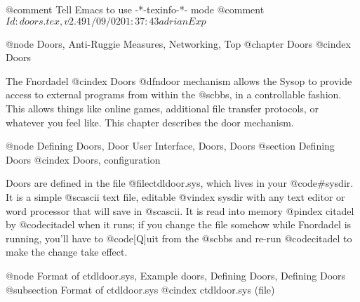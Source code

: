 @comment Tell Emacs to use -*-texinfo-*- mode
@comment $Id: doors.tex,v 2.4 91/09/02 01:37:43 adrian Exp $

@node Doors, Anti-Ruggie Measures, Networking, Top
@chapter Doors
@cindex Doors

The Fnordadel
@cindex Doors
@dfn{door} mechanism allows the Sysop to provide
access to external programs from within the @sc{bbs}, in a controllable fashion.
This allows things like online games, additional file transfer protocols, or
whatever you feel like.  This chapter describes the door mechanism.

@node Defining Doors, Door User Interface, Doors, Doors
@section Defining Doors
@cindex Doors, configuration

Doors are defined in the file @file{ctdldoor.sys}, which lives in
your @code{#sysdir}.  It is a simple @sc{ascii} text file, editable
@vindex sysdir
with any text
editor or word processor that will save in @sc{ascii}.  It is read into memory
@pindex citadel
by @code{citadel} when it runs; if you change the file somehow while
Fnordadel is running, you'll have to @code{[Q]uit} from the @sc{bbs} and re-run
@code{citadel} to make the change take effect.

@node Format of ctdldoor.sys, Example doors, Defining Doors, Defining Doors
@subsection Format of ctdldoor.sys
@cindex ctdldoor.sys (file)

